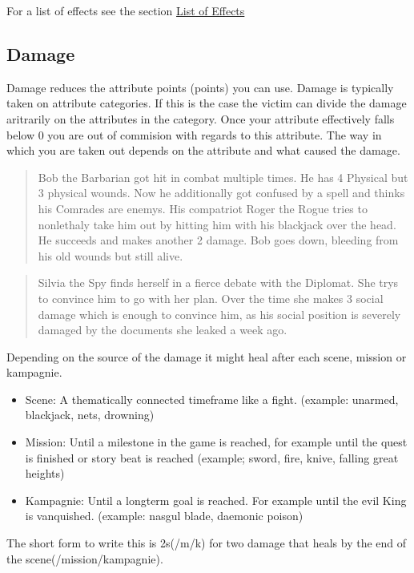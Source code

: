 \documentclass[11pt]{article}
\begin{document}
{\begin{multicols}{2}[]
For a list of effects see the section \hyperref[sec:orgcbc704c]{List of Effects}

\subsection{Damage}
\label{sec:org40ba4fa}
Damage reduces the attribute points (points) you can use. Damage is typically taken on attribute categories. If this is the case the victim can divide the damage aritrarily on the attributes in the category. Once your attribute effectively falls below 0 you are out of commision with regards to this attribute. The way in which you are taken out depends on the attribute and what caused the damage.

\begin{quote}
Bob the Barbarian got hit in combat multiple times. He has 4 Physical but 3 physical wounds. Now he additionally got confused by a spell and thinks his Comrades are enemys. His compatriot Roger the Rogue tries to nonlethaly take him out by hitting him with his blackjack over the head. He succeeds and makes another 2 damage. Bob goes down, bleeding from his old wounds but still alive.
\end{quote}

\begin{quote}
Silvia the Spy finds herself in a fierce debate with the Diplomat. She trys to convince him to go with her plan. Over the time she makes 3 social damage which is enough to convince him, as his social position is severely damaged by the documents she leaked a week ago.
\end{quote}

Depending on the source of the damage it might heal after each scene, mission or kampagnie.
\begin{itemize}
\item Scene: A thematically connected timeframe like a fight. (example: unarmed, blackjack, nets, drowning)
\item Mission: Until a milestone in the game is reached, for example until the quest is finished or story beat is reached (example; sword, fire, knive, falling great heights)
\item Kampagnie: Until a longterm goal is reached. For example until the evil King is vanquished. (example: nasgul blade, daemonic poison)
\end{itemize}
The short form to write this is 2s(/m/k) for two damage that heals by the end of the scene(/mission/kampagnie).


\end{multicols}}
\end{document}
